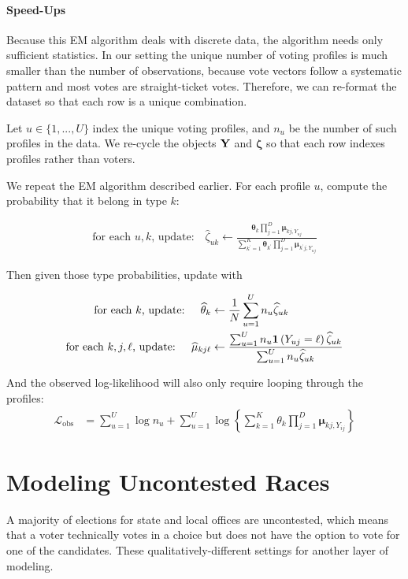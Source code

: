 \documentclass[11pt]{article}
\begin{document}
\paragraph{Speed-Ups} Because this EM algorithm deals with discrete data, the algorithm needs only sufficient statistics. In our setting the unique number of voting profiles is much smaller than the number of observations, because vote vectors follow a systematic pattern and most votes are straight-ticket votes. Therefore, we can re-format the dataset so that each row is a unique combination.

Let \(u \in \{1, ..., U\}\) index the unique voting profiles, and \(n_{u}\) be the number of such profiles in the data.  We re-cycle the objects \(\mathbf{Y}\) and \(\bm\zeta\) so that each row indexes profiles rather than voters.

We repeat the EM algorithm described earlier. For each profile \(u\), compute the probability that it belong in type \(k\):

\begin{align}
\text{for each \(u, k\), update: }~~~   \widehat\zeta_{uk} \leftarrow \frac{\bm{\theta}_{k}\prod^{D}_{j=1}\bm{\mu}_{kj,Y_{uj}}}
{\sum^{K}_{k^\prime=1}\bm{\theta}_{k^\prime}\prod^{D}_{j=1}\bm{\mu}_{k^\prime j,Y_{uj}}}
\end{align}

Then given those type probabilities, update with

\begin{align}
\text{for each \(k\), update: }~~~   \widehat{\theta}_{k} &\leftarrow \frac{1}{N}\sum^U_{u = 1}n_{u}\widehat{\zeta}_{uk}\\
\text{for each \(k, j, \ell\), update: }~~~   \widehat{\mu}_{kj\ell} &\leftarrow\frac{\sum^U_{u=1}n_{u}\bm{1}\left(Y_{uj} = \ell\right)\widehat{\zeta}_{uk}}{\sum^{U}_{u=1}n_{u}\widehat{\zeta}_{uk}}
\end{align}

And the observed log-likelihood will also only require looping through the profiles:
\begin{align}
\mathcal{L}_{\text{obs}} &= \sum^{U}_{u=1}\log n_u + \sum^{U}_{u=1}\log\left\{\sum^{K}_{k=1}\theta_k \prod^{D}_{j=1}\bm{\mu}_{kj,Y_{ij}}\right\}
\end{align}


\section{Modeling Uncontested Races} 

A majority of elections for state and local offices are uncontested, which means that a voter technically votes in a choice but does not have the option to vote for one of the candidates. These qualitatively-different settings for another layer of modeling. 
\end{document}
